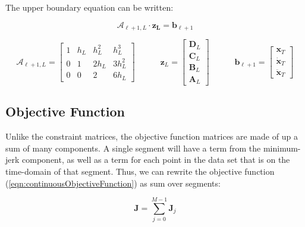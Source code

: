 The upper boundary equation can be written:

\begin{equation}
\mathcal{A}_{\ell+1, L}
\cdot
\bm{z_L}
=
\bm{b}_{\ell+1}
\label{eqn:upperBoundaryConstraintSymbols}
\end{equation}


\begin{equation}

\mathcal{A}_{\ell+1, L}
=
\begin{bmatrix}
1 & h_L & h_L^2  & h_L^3 \\
0 & 1   & 2 h_L  & 3 h_L^2 \\
0 & 0   & 2      & 6 h_L
\end{bmatrix}

\quad \quad \quad

\bm{z}_L
=
\begin{bmatrix}
  \bm{D}_L \\
  \bm{C}_L \\
  \bm{B}_L \\
  \bm{A}_L
\end{bmatrix}

\quad \quad \quad

\bm{b}_{\ell+1}
=
\begin{bmatrix}
  \bm{x}_T \\
  \dot{\bm{x}}_T \\
  \ddot{\bm{x}}_T
\end{bmatrix}

\label{eqn:upperBoundaryConstraint}
\end{equation}




\subsection{Objective Function}

Unlike the constraint matrices, the objective function matrices are made of up a sum
of many components. A single segment will have a term from the minimum-jerk component,
as well as a term for each point in the data set that is on the time-domain of that segment.
Thus, we can rewrite the objective function (\ref{eqn:continuousObjectiveFunction}) as
sum over segments:

\begin{equation}
  \bm{J} =  \sum_{j=0}^{M-1} \bm{J}_j
\end{equation}

